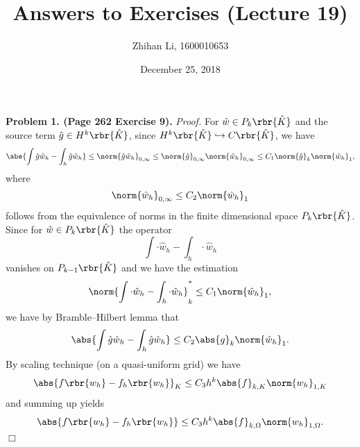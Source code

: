 \documentclass[english, nochinese]{pnote}
\title{Answers to Exercises (Lecture 19)}
\author{Zhihan Li, 1600010653}
\date{December 25, 2018}
\begin{document}
\maketitle

\textbf{Problem 1. (Page 262 Exercise 9).} \textit{Proof.}  For $ \hat{w} \in P_k \rbr{\hat{K}} $ and the source term $ \hat{g} \in H^k \rbr{\hat{K}} $, since $ H^k \rbr{\hat{K}} \hookrightarrow C \rbr{\hat{K}} $, we have
\begin{equation}
\abs{ \int \hat{g} \hat{w}_h - \int_h \hat{g} \hat{w}_h } \le \norm{ \hat{g} \hat{w}_h }_{ 0, \infty } \le \norm{\hat{g}}_{ 0, \infty } \norm{\hat{w}_h}_{ 0, \infty } \le C_1 \norm{\hat{g}}_k \norm{\hat{w}_h}_1,
\end{equation}
where
\begin{equation}
\norm{\hat{w}_h}_{ 0, \infty } \le C_2 \norm{\hat{w}_h}_1
\end{equation}
follows from the equivalence of norms in the finite dimensional space $ P_k \rbr{\hat{K}} $. Since for $\hat{w} \in P_k \rbr{\hat{K}} $ the operator
\begin{equation}
\int \cdot \hat{w}_h - \int_h \cdot \hat{w}_h
\end{equation}
vanishes on $ P_{ k - 1 } \rbr{\hat{K}} $ and we have the estimation
\begin{equation}
\norm{ \int \cdot \hat{w}_h - \int_h \cdot \hat{w}_h }_k^{\ast} \le C_1 \norm{\hat{w}_h}_1,
\end{equation}
we have by Bramble--Hilbert lemma that
\begin{equation}
\abs{ \int \hat{g} \hat{w}_h - \int_h \hat{g} \hat{w}_h } \le C_2 \abs{g}_k \norm{\hat{w}_h}_1.
\end{equation}
By scaling technique (on a quasi-uniform grid) we have
\begin{equation}
\abs{ f \rbr{w_h} - f_h \rbr{w_h} }_K \le C_3 h^k \abs{f}_{ k, K } \norm{w_h}_{ 1, K }
\end{equation}
and summing up yields
\begin{equation}
\abs{ f \rbr{w_h} - f_h \rbr{w_h} } \le C_3 h^k \abs{f}_{ k, \Omega } \norm{w_h}_{ 1, \Omega }.
\end{equation}
\hfill$\Box$
\end{document}
